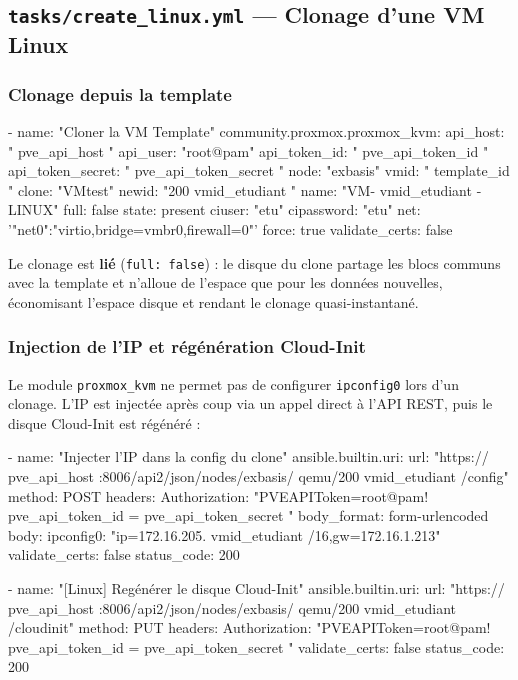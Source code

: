 \documentclass[a4paper]{article}
\newcommand{\cmd}[1]{\texttt{#1}}
\begin{document}
\subsection{\texttt{tasks/create\_linux.yml} --- Clonage d'une VM Linux}

\subsubsection*{Clonage depuis la template}

\begin{yamlcode}
- name: "Cloner la VM Template"
  community.proxmox.proxmox_kvm:
    api_host:         "{{ pve_api_host }}"
    api_user:         "root@pam"
    api_token_id:     "{{ pve_api_token_id }}"
    api_token_secret: "{{ pve_api_token_secret }}"
    node:             "exbasis"
    vmid:             "{{ template_id }}"
    clone:            "VMtest"
    newid:            "200{{ vmid_etudiant }}"
    name:             "VM-{{ vmid_etudiant }}-LINUX"
    full:             false
    state:            present
    ciuser:           "etu"
    cipassword:       "etu"
    net:              '{"net0":"virtio,bridge=vmbr0,firewall=0"}'
    force:            true
    validate_certs:   false
\end{yamlcode}

Le clonage est \textbf{lié} (\cmd{full: false}) : le disque du clone partage les blocs communs avec la template et n'alloue de l'espace que pour les données nouvelles, économisant l'espace disque et rendant le clonage quasi-instantané.

\subsubsection*{Injection de l'IP et régénération Cloud-Init}

Le module \cmd{proxmox\_kvm} ne permet pas de configurer \cmd{ipconfig0} lors d'un clonage. L'IP est injectée après coup via un appel direct à l'API REST, puis le disque Cloud-Init est régénéré :

\begin{yamlcode}
- name: "Injecter l'IP dans la config du clone"
  ansible.builtin.uri:
    url: "https://{{ pve_api_host }}:8006/api2/json/nodes/exbasis/
          qemu/200{{ vmid_etudiant }}/config"
    method: POST
    headers:
      Authorization: "PVEAPIToken=root@pam!{{ pve_api_token_id }}=
                      {{ pve_api_token_secret }}"
    body_format: form-urlencoded
    body:
      ipconfig0: "ip=172.16.205.{{ vmid_etudiant }}/16,gw=172.16.1.213"
    validate_certs: false
    status_code: 200

- name: "[Linux] Regénérer le disque Cloud-Init"
  ansible.builtin.uri:
    url: "https://{{ pve_api_host }}:8006/api2/json/nodes/exbasis/
          qemu/200{{ vmid_etudiant }}/cloudinit"
    method: PUT
    headers:
      Authorization: "PVEAPIToken=root@pam!{{ pve_api_token_id }}=
                      {{ pve_api_token_secret }}"
    validate_certs: false
    status_code: 200
\end{yamlcode}
\end{document}
